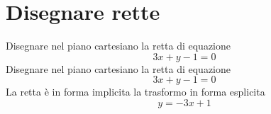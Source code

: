 \section{Disegnare rette}
\begin{exercise}
	Disegnare nel piano cartesiano la retta di equazione \[3x+y-1=0\]
	\tcblower
	Disegnare nel piano cartesiano la retta di equazione \[3x+y-1=0\]
	La retta è in forma implicita la trasformo in forma esplicita\[y=-3x+1\]
	\begin{center}
		
		\label{fig:DiegnareRette1}
	\end{center}
\end{exercise}
